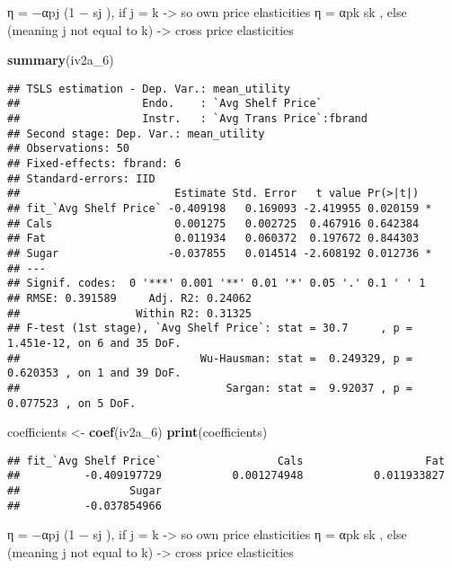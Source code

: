 \documentclass[
]{article}
\newenvironment{Shaded}{\begin{snugshade}}{\end{snugshade}}
\newcommand{\FunctionTok}[1]{\textcolor[rgb]{0.13,0.29,0.53}{\textbf{#1}}}
\newcommand{\NormalTok}[1]{#1}
\newcommand{\OtherTok}[1]{\textcolor[rgb]{0.56,0.35,0.01}{#1}}
\begin{document}
η = −αpj (1 − sj ), if j = k -\textgreater{} so own price elasticities η
= αpk sk , else (meaning j not equal to k) -\textgreater{} cross price
elasticities

\begin{Shaded}
\begin{Highlighting}[]
\FunctionTok{summary}\NormalTok{(iv2a\_6)}
\end{Highlighting}
\end{Shaded}

\begin{verbatim}
## TSLS estimation - Dep. Var.: mean_utility
##                   Endo.    : `Avg Shelf Price`
##                   Instr.   : `Avg Trans Price`:fbrand
## Second stage: Dep. Var.: mean_utility
## Observations: 50
## Fixed-effects: fbrand: 6
## Standard-errors: IID 
##                        Estimate Std. Error   t value Pr(>|t|)    
## fit_`Avg Shelf Price` -0.409198   0.169093 -2.419955 0.020159 *  
## Cals                   0.001275   0.002725  0.467916 0.642384    
## Fat                    0.011934   0.060372  0.197672 0.844303    
## Sugar                 -0.037855   0.014514 -2.608192 0.012736 *  
## ---
## Signif. codes:  0 '***' 0.001 '**' 0.01 '*' 0.05 '.' 0.1 ' ' 1
## RMSE: 0.391589     Adj. R2: 0.24062
##                  Within R2: 0.31325
## F-test (1st stage), `Avg Shelf Price`: stat = 30.7     , p = 1.451e-12, on 6 and 35 DoF.
##                            Wu-Hausman: stat =  0.249329, p = 0.620353 , on 1 and 39 DoF.
##                                Sargan: stat =  9.92037 , p = 0.077523 , on 5 DoF.
\end{verbatim}

\begin{Shaded}
\begin{Highlighting}[]
\NormalTok{coefficients }\OtherTok{\textless{}{-}} \FunctionTok{coef}\NormalTok{(iv2a\_6)}
\FunctionTok{print}\NormalTok{(coefficients)}
\end{Highlighting}
\end{Shaded}

\begin{verbatim}
## fit_`Avg Shelf Price`                  Cals                   Fat 
##          -0.409197729           0.001274948           0.011933827 
##                 Sugar 
##          -0.037854966
\end{verbatim}

η = −αpj (1 − sj ), if j = k -\textgreater{} so own price elasticities η
= αpk sk , else (meaning j not equal to k) -\textgreater{} cross price
elasticities
\end{document}
